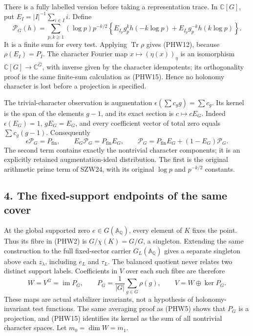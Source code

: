 \documentclass[
  10pt,
  a4paper,
]{article}
\begin{document}
There is a fully labelled version before taking a representation trace.
In \(\mathbb C[G]\), put \(E_I=|I|^{-1}\sum_{i\in I}i\). Define \[
\mathscr P_G(h)=\sum_{p,k\ge1}(\log p)p^{-k/2}
\left\{E_{I_p}g_p^k h(-k\log p)
+E_{I_p}g_p^{-k} h(k\log p)\right\}.
\tag{PHW17}
\] It is a finite sum for every test. Applying \(\operatorname{Tr}\rho\)
gives (PHW12), because \(\rho(E_I)=P_I\). The character Fourier map
\(x\mapsto(\eta(x))_\eta\) is an isomorphism
\(\mathbb C[G]\to\mathbb C^{\widehat G}\), with inverse given by the
character idempotents; its orthogonality proof is the same finite-sum
calculation as (PHW15). Hence no holonomy character is lost before a
projection is specified.

The trivial-character observation is augmentation
\(\epsilon(\sum c_g g)=\sum c_g\). Its kernel is the span of the
elements \(g-1\), and its exact section is \(c\mapsto cE_G\). Indeed
\(\epsilon(E_G)=1\), \(gE_G=E_G\), and every coefficient vector of total
zero equals \(\sum c_g(g-1)\). Consequently \[
\epsilon\mathscr P_G=P_{\mathrm{fin}},
\qquad E_G\mathscr P_G=P_{\mathrm{fin}}E_G,
\qquad
\mathscr P_G=P_{\mathrm{fin}}E_G+(1-E_G)\mathscr P_G.
\tag{PHW18}
\] The second term contains exactly the nontrivial character components;
it is an explicitly retained augmentation-ideal distribution. The first
is the original arithmetic prime term of SZW24, with its original
\(\log p\) and \(p^{-k/2}\) constants.

\subsection{4. The fixed-support endpoints of the same
cover}\label{the-fixed-support-endpoints-of-the-same-cover}

At the global supported zero \(e\in G(\mathbb A_{\mathbb Q})\), every
element of \(K\) fixes the point. Thus its fibre in (PHW2) is
\(G/\chi(K)=G/G\), a singleton. Extending the same construction to the
full fixed-sector carrier \(G_L(\mathbb A_{\mathbb Q})\) gives a
separate singleton above each \(z_\lambda\), including \(e_L\) and
\(\tau_L\). The balanced quotient never relates two distinct support
labels. Coefficients in \(V\) over each such fibre are therefore \[
W=V^G=\operatorname{im}P_G,
\qquad P_G=\frac1{|G|}\sum_{g\in G}\rho(g),
\qquad V=W\oplus\ker P_G.
\tag{PHW19}
\] These maps are actual stabilizer invariants, not a hypothesis of
holonomy-invariant test functions. The same averaging proof as (PHW5)
shows that \(P_G\) is a projection, and (PHW15) identifies its kernel as
the sum of all nontrivial character spaces. Let \(m_0=\dim W=m_1\).
\end{document}
